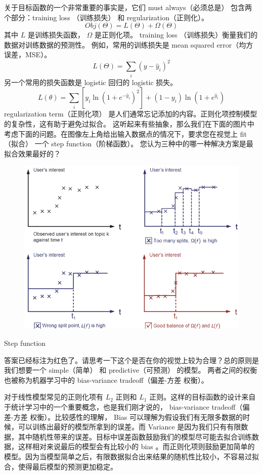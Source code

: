 \documentclass{article}
\begin{document}
关于目标函数的一个非常重要的事实是，它们 must always（必须总是） 包含两个部分：training loss （训练损失） 和 regularization（正则化）。
\[Obj(\Theta)=L(\Theta)+\Omega(\Theta)\]
其中 $L$ 是训练损失函数， $\Omega$ 是正则化项。 training loss （训练损失）衡量我们的数据对训练数据的预测性。 例如，常用的训练损失是 mean squared error（均方误差，MSE）。
\[L(\Theta)=\sum_i(y-\hat{y}_i)^2\]
另一个常用的损失函数是 logistic 回归的 logistic 损失。
\[L(\theta)=\sum_i[y_i\ln(1+e^{-\hat{y}_i})^2]+(1-y_i)\ln(1+e^{\hat{y}_i})\]
regularization term（正则化项） 是人们通常忘记添加的内容。正则化项控制模型的复杂性，这有助于避免过拟合。 这听起来有些抽象，那么我们在下面的图片中考虑下面的问题。在图像左上角给出输入数据点的情况下，要求您在视觉上 fit（拟合） 一个 step function（阶梯函数）。 您认为三种中的哪一种解决方案是最拟合效果最好的？
\begin{figure}[H]
\centering
	\includegraphics[scale=0.5]{step_fit.png}
\end{figure}
Step function

答案已经标注为红色了。请思考一下这个是否在你的视觉上较为合理？总的原则是我们想要一个 simple（简单） 和 predictive（可预测） 的模型。 两者之间的权衡也被称为机器学习中的 bias-variance tradeoff（偏差-方差 权衡）。

对于线性模型常见的正则化项有 $L_2$ 正则和 $L_1$ 正则。这样的目标函数的设计来自于统计学习中的一个重要概念，也是我们刚才说的， bias-variance tradeoff（偏差-方差 权衡）。比较感性的理解， Bias 可以理解为假设我们有无限多数据的时候，可以训练出最好的模型所拿到的误差。而 Variance 是因为我们只有有限数据，其中随机性带来的误差。目标中误差函数鼓励我们的模型尽可能去拟合训练数据，这样相对来说最后的模型会有比较小的 bias 。而正则化项则鼓励更加简单的模型。因为当模型简单之后，有限数据拟合出来结果的随机性比较小，不容易过拟合，使得最后模型的预测更加稳定。
\end{document}
